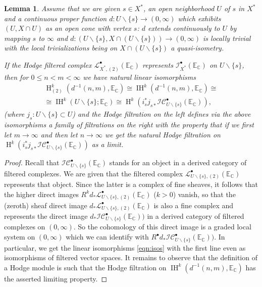 \documentclass[12pt,letterpaper]{amsart}
\numberwithin{equation}{section}
\def\CC{{\mathbb C}}
\def\EE{{\mathbb E}}
\def\ssm{\smallsetminus}
\def\Iscr{{\mathscr I}}
\def\Lscr{{\mathscr L}}
\def\Cscr{{\mathscr C}}
\def\pt{{\scriptscriptstyle\bullet}}
\newcommand\Hl{\operatorname{H}}
\newcommand\IH{\operatorname{IH}}
\newtheorem{lemma}[theorem]{Lemma}
\theoremstyle{remark}
\begin{document}
\begin{lemma}\label{lemma:limit}  
Assume that we are given $s\in X^*$, an open  neighborhood $U$ of $s$ in $X^*$ and a continuous  proper function 
$d: U\ssm \{s\}\to (0,\infty)$  which exhibits $(U, X\cap U)$ as an open cone with vertex $s$: $d$ extends continuously to $U$ by  mapping $s$ to $\infty$ and  $d: (U\ssm \{s\}, X\cap (U\ssm \{s\}))\to (0,\infty)$ is locally trivial with the local trivializations being on
$ X\cap (U\ssm \{s\})$ a quasi-isometry. 

If the Hodge filtered complex $\Lscr^\pt_{X^*,(2)}(\EE_\CC)$ represents $\Iscr^\pt_{X^*}(\EE_\CC)$ on  $U\ssm \{s\}$, 
then  for  $0\le n<m <\infty$  we have   natural linear  isomorphisms 
\begin{multline}\label{eqn:isos}
\Hl^k_{(2)} (d^{-1}(n,m), \EE_\CC)\cong\IH^k (d^{-1}(n,m), \EE_\CC)\cong\\
\cong  \IH^k(U\ssm \{s\}; \EE_\CC)\cong\Hl^k(i_s^*j_{s*}\Iscr\Cscr_{U\ssm\{s\}}^\pt(\EE_\CC)),
\end{multline}
(where  $j_s:U\ssm \{s\}\subset U$) and  the  Hodge filtration on  the left   defines via the above isomorphisms a family of filtrations on the right with the property that  if we first let $m\to \infty$ and then let $n\to \infty$ we get the natural  Hodge filtration on $\Hl^k(i^*_sj_{s*}\Iscr\Cscr_{U\ssm\{s\}}^\pt(\EE_\CC))$ as a limit.
\end{lemma}
\begin{proof}
Recall that  $\Iscr\Cscr_{U\ssm\{s\}}^\pt(\EE_\CC)$ stands for an object in a derived category of filtered complexes. We are given that the filtered complex $\Lscr^\pt_{U\ssm\{s\},(2)}(\EE_\CC)$ represents that object. Since  the latter   is a complex of  fine sheaves, it follows that the higher direct images $R^kd_*\Lscr^\pt_{U\ssm\{s\},(2)}(\EE_\CC)$ ($k>0$) vanish, so that 
the (zeroth) sheaf direct image $d_*\Lscr^\pt_{U\ssm\{s\},(2)}(\EE_\CC)$ is also a fine complex and represents the direct image 
$d_*\Iscr\Cscr_{U\ssm\{s\}}^\pt(\EE_\CC))$ in a  derived category of  filtered complexes on $(0, \infty)$. So the cohomology of this direct image is a graded local system on $(0, \infty)$ which we can  identify with $R^\pt d_*\Iscr\Cscr_{U\ssm\{s\}}^\pt(\EE_\CC))$. 
In particular, we  get the linear isomorphisms \eqref{eqn:isos}  with the first line even as  isomorphisms of filtered vector spaces. 
It remains to observe  that the definition of a  Hodge module is such that the Hodge  filtration on $\IH^k (d^{-1}(n,m), \EE_\CC)$ has the asserted limiting property.
\end{proof}
\end{document}
